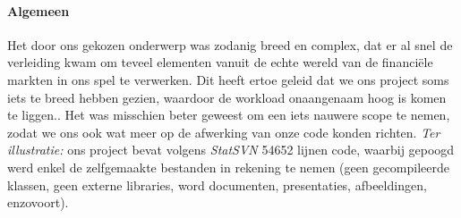 \paragraph{Algemeen} Het door ons gekozen onderwerp was zodanig breed en complex, dat er al snel de verleiding kwam om teveel elementen vanuit de echte wereld van de financi\"ele markten in ons spel te verwerken. Dit heeft ertoe geleid dat we ons project soms iets te breed hebben gezien, waardoor de workload onaangenaam hoog is komen te liggen.. Het was misschien beter geweest om een iets nauwere scope te nemen, zodat we ons ook wat meer op de afwerking van onze code konden richten.
\emph{Ter illustratie: }ons project bevat volgens \emph{StatSVN} 54652 lijnen code, waarbij gepoogd werd enkel de zelfgemaakte bestanden in rekening te nemen (geen gecompileerde klassen, geen externe libraries, word documenten, presentaties, afbeeldingen, enzovoort). 


